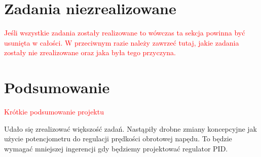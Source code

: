 \documentclass[10pt, a4paper]{article}
\begin{document}
\section{Zadania niezrealizowane}
\textcolor{red}{Jeśli wszystkie zadania zostały realizowane to wówczas 
	ta sekcja powinna być usunięta w całości. W przeciwnym razie
	należy zawrzeć tutaj, jakie zadania zostały nie zrealizowane 
	oraz jaka była tego przyczyna.
}

\section{Podsumowanie}
\textcolor{red}{Krótkie podsumowanie projektu}

Udało się zrealizować większość zadań. Nastąpiły drobne zmiany koncepcyjne jak użycie potencjometru do regulacji prędkości obrotowej napędu. To będzie wymagać mniejszej ingerencji gdy będziemy projektować regulator PID.

\newpage
{}


\end{document}
